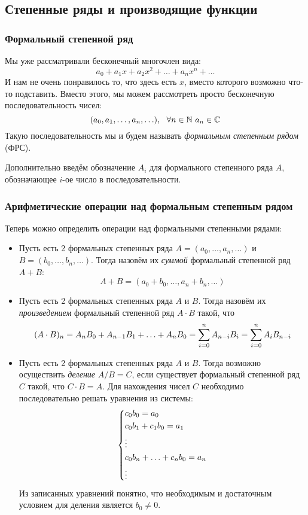 \subsection{Степенные ряды и производящие функции}

\subsubsection*{Формальный степенной ряд}

\begin{definition}
	Мы уже рассматривали бесконечный многочлен вида:
	\[
		a_0 + a_1 x + a_2 x^2 + \ldots + a_n x^n + \ldots
	\]
	И нам не очень понравилось то, что здесь есть $x$, вместо которого возможно что-то подставить. Вместо этого, мы можем рассмотреть просто бесконечную последовательность чисел:
	\[
		(a_0, a_1, \ldots, a_n, \ldots),\ \ \forall n \in \mathbb{N}\ a_n \in \mathbb{C}
	\]
	Такую последовательность мы и будем называть \textit{формальным степенным рядом} (ФРС).
	
	Дополнительно введём обозначение $A_i$ для формального степенного ряда $A$, обозначающее $i$-ое число в последовательности.
\end{definition}

\subsubsection*{Арифметические операции над формальным степенным рядом}

Теперь можно определить операции над формальными степенными рядами:
\begin{itemize}
	\item Пусть есть 2 формальных степенных ряда $A = (a_0, \ldots, a_n, \ldots)$ и $B = (b_0, \ldots, b_n, \ldots)$. Тогда назовём их \textit{суммой} формальный степенной ряд $A + B$:
	\[
		A + B = (a_0 + b_0, \ldots, a_n + b_n, \ldots)
	\]
	
	\item Пусть есть 2 формальных степенных ряда $A$ и $B$. Тогда назовём их \textit{произведением} формальный степенной ряд $A \cdot B$ такой, что
	\[
		(A \cdot B)_n = A_nB_0 + A_{n - 1}B_{1} + \ldots + A_nB_0 = \sum\limits_{i = 0}^n A_{n - i}B_i = \sum\limits_{i = 0}^n A_iB_{n - i}
	\]
	
	\item Пусть есть 2 формальных степенных ряда $A$ и $B$. Тогда возможно осуществить \textit{деление} $A / B = C$, если существует формальный степенной ряд $C$ такой, что $C \cdot B = A$. Для нахождения чисел $C$ необходимо последовательно решать уравнения из системы:
	\[
	\left\{\begin{aligned}
		&{c_0 b_0 = a_0}
		\\
		&{c_0 b_1 + c_1 b_0 = a_1}
		\\
		&\vdots
		\\
		&{c_0 b_n + \ldots + c_n b_0 = a_n}
		\\
		&\vdots
	\end{aligned}\right.
	\]
	Из записанных уравнений понятно, что необходимым и достаточным условием для деления является $b_0 \neq 0$.
\end{itemize}

